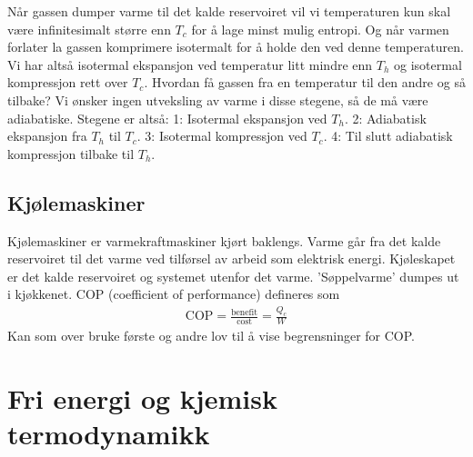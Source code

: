 \documentclass[12pt]{article}
\begin{document}
Når gassen dumper varme til det kalde reservoiret vil vi temperaturen kun skal
være infinitesimalt større enn $T_c$ for å lage minst mulig entropi. Og når varmen
forlater la gassen komprimere isotermalt for å holde den ved denne temperaturen.
Vi har altså isotermal ekspansjon ved temperatur litt mindre enn $T_h$ og isotermal
kompressjon rett over $T_c$. Hvordan få gassen fra en temperatur til den andre og
så tilbake? Vi ønsker ingen utveksling av varme i disse stegene, så de må være
adiabatiske. Stegene er altså: 1: Isotermal ekspansjon ved $T_h$. 2: Adiabatisk ekspansjon
fra $T_h$ til $T_c$. 3: Isotermal kompressjon ved $T_c$. 4: Til slutt adiabatisk kompressjon tilbake til $T_h$.

\subsection{Kjølemaskiner}
Kjølemaskiner er varmekraftmaskiner kjørt baklengs. Varme går fra det kalde
reservoiret til det varme ved tilførsel av arbeid som elektrisk energi. Kjøleskapet
er det kalde reservoiret og systemet utenfor det varme. 'Søppelvarme' dumpes ut
i kjøkkenet. COP (coefficient of performance) defineres som
\begin{align*}
  \text{COP} = \frac{\text{benefit}}{\text{cost}} = \frac{Q_c}{W}
\end{align*}
Kan som over bruke første og andre lov til å vise begrensninger for COP.
\section{Fri energi og kjemisk termodynamikk}
\end{document}
